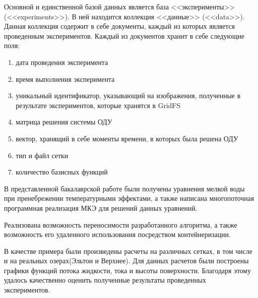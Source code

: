 \documentclass[14pt]{extreport}
\begin{document}
Основной и единственной базой данных является база <<эксперименты>> (<<experiments>>). В ней находится коллекция  <<данные>> (<<data>>). Данная коллекция содержит в себе документы, каждый из которых является проведенным экспериментов. Каждый из документов хранит в себе следующие поля:

\begin{enumerate}
\item дата проведения эксперимента
\item время выполнения эксперимента
\item уникальный идентификатор, указывающий на изображения, полученные в результате экспериментов, которые хранятся в GridFS
\item матрица решения системы ОДУ
\item вектор, хранящий в себе моменты времени, в которых была решена ОДУ
\item тип и файл сетки
\item количество базисных функций
\end{enumerate}

\conclusions
В представленной бакалаврской работе были получены уравнения мелкой воды при пренебрежении температурными эффектами, а также написана многопоточная программная реализация МКЭ для решений данных уравнений.

Реализована возможность переносимости разработанного алгоритма, а также возможность его удаленного использования посредством контейнеризации.

В качестве примера были произведены расчеты на различных сетках, в том числе и на реальных озерах(Эльтон и Верхнее). Для данных расчетов были построены графики функций потока жидкости, тока и высоты поверхности. Благодаря этому удалось качественно оценить полученные результаты проведенных экспериментов.




\end{document}

